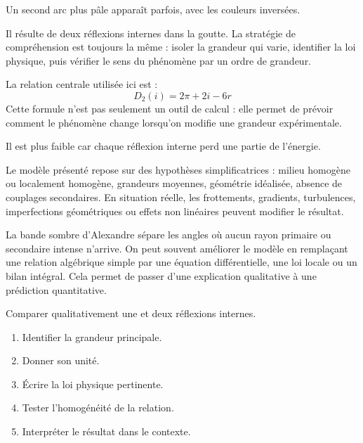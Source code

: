\documentclass[11pt,a4paper]{article}
\begin{document}
\begin{exemplebox}
Un second arc plus pâle apparaît parfois, avec les couleurs inversées.
\end{exemplebox}

\begin{methodebox}
Il résulte de deux réflexions internes dans la goutte.
La stratégie de compréhension est toujours la même : isoler la grandeur qui varie, identifier la loi physique, puis vérifier le sens du phénomène par un ordre de grandeur.
\end{methodebox}

\begin{theorembox}
La relation centrale utilisée ici est :
\[
D_2(i)=2\pi+2i-6r
\]
Cette formule n'est pas seulement un outil de calcul : elle permet de prévoir comment le phénomène change lorsqu'on modifie une grandeur expérimentale.
\end{theorembox}

\begin{odgbox}
Il est plus faible car chaque réflexion interne perd une partie de l'énergie.
\end{odgbox}

\begin{attentionbox}
Le modèle présenté repose sur des hypothèses simplificatrices : milieu homogène ou localement homogène, grandeurs moyennes, géométrie idéalisée, absence de couplages secondaires. En situation réelle, les frottements, gradients, turbulences, imperfections géométriques ou effets non linéaires peuvent modifier le résultat.
\end{attentionbox}

\begin{approfondissementbox}
La bande sombre d'Alexandre sépare les angles où aucun rayon primaire ou secondaire intense n'arrive.
On peut souvent améliorer le modèle en remplaçant une relation algébrique simple par une équation différentielle, une loi locale ou un bilan intégral. Cela permet de passer d'une explication qualitative à une prédiction quantitative.
\end{approfondissementbox}

\begin{exercicebox}
Comparer qualitativement une et deux réflexions internes.
\begin{enumerate}
  \item Identifier la grandeur principale.
  \item Donner son unité.
  \item Écrire la loi physique pertinente.
  \item Tester l'homogénéité de la relation.
  \item Interpréter le résultat dans le contexte.
\end{enumerate}
\end{exercicebox}
\end{document}
